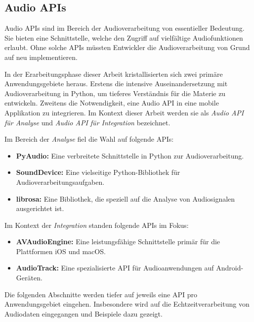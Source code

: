 \documentclass[11pt,a4paper]{article}
\begin{document}
\subsection{Audio APIs}
Audio APIs sind im Bereich der Audioverarbeitung von essentieller Bedeutung. Sie bieten eine
Schnittstelle, welche den Zugriff auf vielfältige Audiofunktionen erlaubt. Ohne solche APIs müssten
Entwickler die Audioverarbeitung von Grund auf neu implementieren.

\noindent \newline
In der Erarbeitungsphase dieser Arbeit kristallisierten sich zwei primäre Anwendungsgebiete heraus.
Erstens die intensive Auseinandersetzung mit Audioverarbeitung in Python, um tieferes Verständnis
für die Materie zu entwickeln. Zweitens die Notwendigkeit, eine Audio API in eine mobile
Applikation zu integrieren. Im Kontext dieser Arbeit werden sie als \textit{Audio API für Analyse}
und \textit{Audio API für Integration} bezeichnet.

\noindent \newline
Im Bereich der \textit{Analyse} fiel die Wahl auf folgende APIs:

\begin{itemize}[itemsep=0pt, parsep=0pt]
	\item \textbf{PyAudio:} Eine verbreitete Schnittstelle in Python zur Audioverarbeitung.
	\item \textbf{SoundDevice:} Eine vielseitige Python-Bibliothek für Audioverarbeitungsaufgaben.
	\item \textbf{librosa:} Eine Bibliothek, die speziell auf die Analyse von Audiosignalen
	      ausgerichtet ist.
\end{itemize}

\noindent
Im Kontext der \textit{Integration} standen folgende APIs im Fokus:

\begin{itemize}[itemsep=0pt, parsep=0pt]
	\item \textbf{AVAudioEngine:} Eine leistungsfähige Schnittstelle primär für die Plattformen iOS
	      und macOS.
	\item \textbf{AudioTrack:} Eine spezialisierte API für Audioanwendungen auf Android-Geräten.
\end{itemize}

\noindent
Die folgenden Abschnitte werden tiefer auf jeweils eine API pro Anwendungsgebiet eingehen. 
Insbesondere wird auf die Echtzeitverarbeitung von Audiodaten eingegangen und Beispiele dazu
gezeigt.
\end{document}
